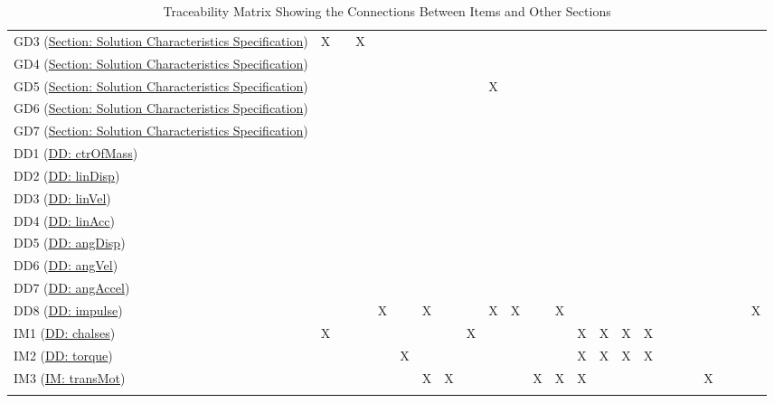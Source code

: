 \documentclass[12pt]{article}
\begin{document}
\begin{longtable}{l l l l l l l l l l l l l l l l l l l l l l l l}
\\
GD3 (\hyperref[Sec:SolCharSpec]{Section: Solution Characteristics Specification}) & X &  & X &  &  &  &  &  &  &  &  &  &  &  &  &  &  &  &  &  &  &  & 
\\
GD4 (\hyperref[Sec:SolCharSpec]{Section: Solution Characteristics Specification}) &  &  &  &  &  &  &  &  &  &  &  &  &  &  &  &  &  &  &  &  &  &  & 
\\
GD5 (\hyperref[Sec:SolCharSpec]{Section: Solution Characteristics Specification}) &  &  &  &  &  &  &  &  & X &  &  &  &  &  &  &  &  &  &  &  &  &  & 
\\
GD6 (\hyperref[Sec:SolCharSpec]{Section: Solution Characteristics Specification}) &  &  &  &  &  &  &  &  &  &  &  &  &  &  &  &  &  &  &  &  &  &  & 
\\
GD7 (\hyperref[Sec:SolCharSpec]{Section: Solution Characteristics Specification}) &  &  &  &  &  &  &  &  &  &  &  &  &  &  &  &  &  &  &  &  &  &  & 
\\
DD1 (\hyperref[DD:ctrOfMass]{DD: ctrOfMass}) &  &  &  &  &  &  &  &  &  &  &  &  &  &  &  &  &  &  &  &  &  &  & 
\\
DD2 (\hyperref[DD:linDisp]{DD: linDisp}) &  &  &  &  &  &  &  &  &  &  &  &  &  &  &  &  &  &  &  &  &  &  & 
\\
DD3 (\hyperref[DD:linVel]{DD: linVel}) &  &  &  &  &  &  &  &  &  &  &  &  &  &  &  &  &  &  &  &  &  &  & 
\\
DD4 (\hyperref[DD:linAcc]{DD: linAcc}) &  &  &  &  &  &  &  &  &  &  &  &  &  &  &  &  &  &  &  &  &  &  & 
\\
DD5 (\hyperref[DD:angDisp]{DD: angDisp}) &  &  &  &  &  &  &  &  &  &  &  &  &  &  &  &  &  &  &  &  &  &  & 
\\
DD6 (\hyperref[DD:angVel]{DD: angVel}) &  &  &  &  &  &  &  &  &  &  &  &  &  &  &  &  &  &  &  &  &  &  & 
\\
DD7 (\hyperref[DD:angAccel]{DD: angAccel}) &  &  &  &  &  &  &  &  &  &  &  &  &  &  &  &  &  &  &  &  &  &  & 
\\
DD8 (\hyperref[DD:impulse]{DD: impulse}) &  &  &  & X &  & X &  &  & X & X &  & X &  &  &  &  &  &  &  &  &  &  & X
\\
IM1 (\hyperref[DD:chalses]{DD: chalses}) & X &  &  &  &  &  &  & X &  &  &  &  & X & X & X & X &  &  &  &  &  &  & 
\\
IM2 (\hyperref[DD:torque]{DD: torque}) &  &  &  &  & X &  &  &  &  &  &  &  & X & X & X & X &  &  &  &  &  &  & 
\\
IM3 (\hyperref[IM:transMot]{IM: transMot}) &  &  &  &  &  & X & X &  &  &  & X & X & X &  &  &  &  &  &  & X &  &  & 
\\
\bottomrule
\caption{Traceability Matrix Showing the Connections Between Items and Other Sections}
\label{Table:TraceyItemsSecs}
\end{longtable}
\end{document}

